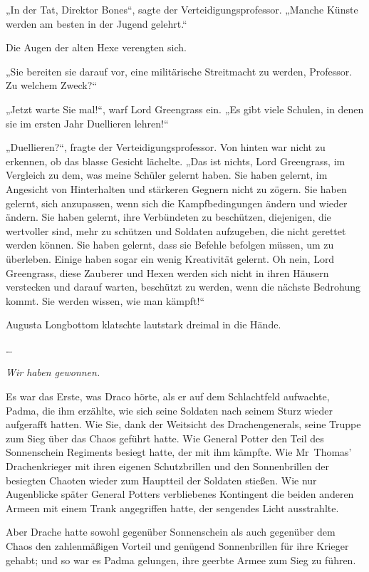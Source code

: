 {„In der Tat, Direktor Bones“, sagte der Verteidigungsprofessor. „Manche Künste werden am besten in der Jugend gelehrt.“

Die Augen der alten Hexe verengten sich.

„Sie bereiten sie darauf vor, eine militärische Streitmacht zu werden, Professor. Zu welchem Zweck?“

„Jetzt warte Sie mal!“, warf Lord Greengrass ein. „Es gibt viele Schulen, in denen sie im ersten Jahr Duellieren lehren!“

„Duellieren?“, fragte der Verteidigungsprofessor. Von hinten war nicht zu erkennen, ob das blasse Gesicht lächelte. „Das ist nichts, Lord Greengrass, im Vergleich zu dem, was meine Schüler gelernt haben. Sie haben gelernt, im Angesicht von Hinterhalten und stärkeren Gegnern nicht zu zögern. Sie haben gelernt, sich anzupassen, wenn sich die Kampfbedingungen ändern und wieder ändern. Sie haben gelernt, ihre Verbündeten zu beschützen, diejenigen, die wertvoller sind, mehr zu schützen und Soldaten aufzugeben, die nicht gerettet werden können. Sie haben gelernt, dass sie Befehle befolgen müssen, um zu überleben. Einige haben sogar ein wenig Kreativität gelernt. Oh nein, Lord Greengrass, diese Zauberer und Hexen werden sich nicht in ihren Häusern verstecken und darauf warten, beschützt zu werden, wenn die nächste Bedrohung kommt. Sie werden wissen, wie man kämpft!“

Augusta Longbottom klatschte lautstark dreimal in die Hände.

…

\emph{Wir haben gewonnen.}

Es war das Erste, was Draco hörte, als er auf dem Schlachtfeld aufwachte, Padma, die ihm erzählte, wie sich seine Soldaten nach seinem Sturz wieder aufgerafft hatten. Wie Sie, dank der Weitsicht des Drachengenerals, seine Truppe zum Sieg über das Chaos geführt hatte. Wie General Potter den Teil des Sonnenschein Regiments besiegt hatte, der mit ihm kämpfte. Wie Mr~Thomas' Drachenkrieger mit ihren eigenen Schutzbrillen und den Sonnenbrillen der besiegten Chaoten wieder zum Hauptteil der Soldaten stießen. Wie nur Augenblicke später General Potters verbliebenes Kontingent die beiden anderen Armeen mit einem Trank angegriffen hatte, der sengendes Licht ausstrahlte.

Aber Drache hatte sowohl gegenüber Sonnenschein als auch gegenüber dem Chaos den zahlenmäßigen Vorteil und genügend Sonnenbrillen für ihre Krieger gehabt; und so war es Padma gelungen, ihre geerbte Armee zum Sieg zu führen.

}
